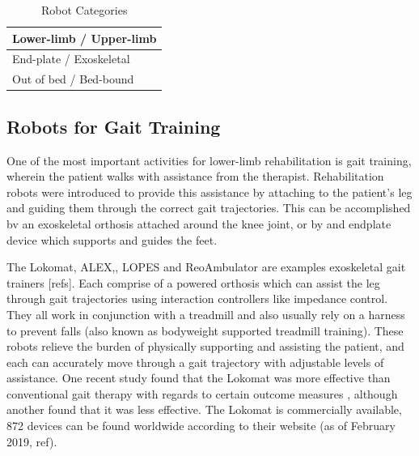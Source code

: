 \documentclass[12pt]{report}
\begin{document}
		
	
	\begin{table}[]
	\centering
	\caption{Robot Categories}	
	\begin{tabular}{|l|}
		\hline
 		Lower-limb / Upper-limb  \\ \hline
 		End-plate / Exoskeletal \\ \hline
 		Out of bed / Bed-bound  \\ \hline
		\end{tabular}
	\label{tab:motor}
	\end{table}


	
	\subsection{Robots for Gait Training}

	One of the most important activities for lower-limb rehabilitation is gait training, wherein the patient walks with assistance from the therapist. Rehabilitation robots were introduced to provide this assistance by attaching to the patient's leg and guiding them through the correct gait trajectories. This can be accomplished bv an exoskeletal orthosis attached around the knee joint, or by and endplate device which supports and guides the feet. 
	
	The Lokomat, ALEX,, LOPES and ReoAmbulator are examples exoskeletal gait trainers [refs]. Each  comprise of a powered orthosis which can assist the leg through gait trajectories using interaction controllers like impedance control. They all work in conjunction with a treadmill and also usually rely on a harness to prevent falls (also known as bodyweight supported treadmill training). These robots relieve the burden of physically supporting and assisting the patient, and each can accurately move through a gait trajectory with adjustable levels of assistance. One recent study found that the Lokomat was more effective than conventional gait therapy with regards to certain outcome measures \cite{Nam2017}, although another found that it was less effective. The Lokomat is commercially available, 872 devices can be found worldwide according to their website (as of February 2019, ref).
	
	
\end{document}

